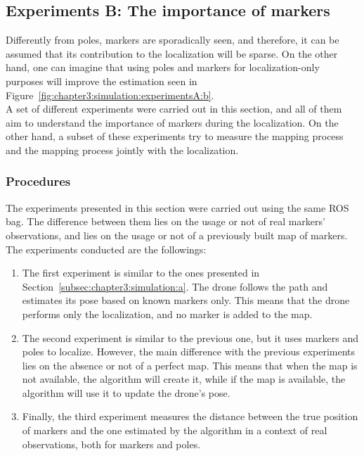 \subsection{Experiments B: The importance of markers}
\label{subsec:chapter3:simulation:b}
Differently from poles, markers are sporadically seen, and therefore, it can be assumed that its contribution to the localization will be sparse. On the other hand, one can imagine that using poles and markers for localization-only purposes will improve the estimation seen in Figure~\ref{fig:chapter3:simulation:experimentsA:b}.\\

A set of different experiments were carried out in this section, and all of them aim to understand the importance of markers during the localization. On the other hand, a subset of these experiments try to measure the mapping process and the mapping process jointly with the localization.

\subsubsection{Procedures}
\label{subsubsec:chapter3:simulation:b:procedures}
The experiments presented in this section were carried out using the same \ac{ROS} bag. The difference between them lies on the usage or not of real markers' observations, and lies on the usage or not of a previously built map of markers.\\

The experiments conducted are the followings:
\begin{enumerate}
    \item{The first experiment is similar to the ones presented in Section~\ref{subsec:chapter3:simulation:a}. The drone follows the path and estimates its pose based on known markers only. This means that the drone performs only the localization, and no marker is added to the map.}
    \item{The second experiment is similar to the previous one, but it uses markers and poles to localize. However, the main difference with the previous experiments lies on the absence or not of a perfect map. This means that when the map is not available, the algorithm will create it, while if the map is available, the algorithm will use it to update the drone's pose.}
    \item{Finally, the third experiment measures the distance between the true position of markers and the one estimated by the algorithm in a context of real observations, both for markers and poles.}
\end{enumerate}


